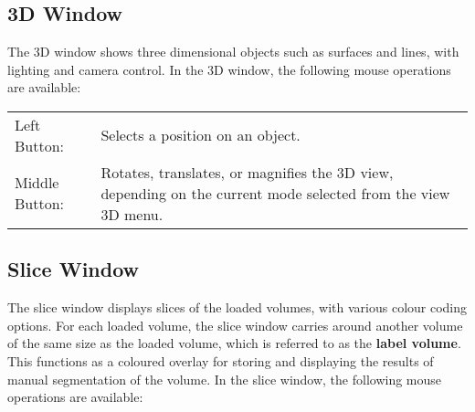 \documentclass{article}
\begin{document}
\subsection{3D Window}

The 3D window shows three dimensional objects such as surfaces and
lines, with lighting and camera control.  In the 3D window, the following
mouse operations are available:

\vspace{.5cm}
\begin{tabular}[t]{p{3cm}p{7cm}}
Left Button:  &  Selects a position on an object. \\
Middle Button:  &  Rotates, translates, or magnifies the 3D view, depending
                      on the current mode selected from the view 3D menu.
\end{tabular}

\subsection{Slice Window}

The slice window displays slices of the loaded volumes, with various
colour coding
options.  For each loaded volume, the slice window carries around another
volume of the same size as the loaded volume, which is referred to as the
{\bf label volume}.
This functions as a coloured overlay for storing and displaying the results
of manual segmentation of the volume.
In the slice window, the following mouse operations are available:

\vspace{.5cm}
\end{document}
